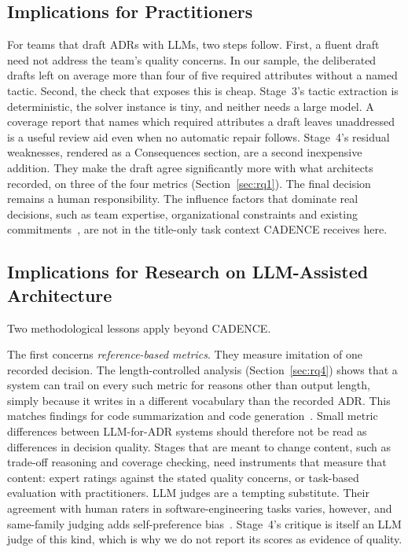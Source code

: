 \documentclass[preprint,12pt,authoryear]{elsarticle}
\renewcommand{\_}{\textunderscore\allowbreak{}}
\begin{document}
\subsection{Implications for Practitioners}

For teams that draft ADRs with LLMs, two steps follow. First, a fluent draft need not address the team's quality concerns. In our sample, the deliberated drafts left on average more than four of five required attributes without a named tactic. Second, the check that exposes this is cheap. Stage~3's tactic extraction is deterministic, the solver instance is tiny, and neither needs a large model. A coverage report that names which required attributes a draft leaves unaddressed is a useful review aid even when no automatic repair follows. Stage~4's residual weaknesses, rendered as a Consequences section, are a second inexpensive addition. They make the draft agree significantly more with what architects recorded, on three of the four metrics (Section~\ref{sec:rq1}). The final decision remains a human responsibility. The influence factors that dominate real decisions, such as team expertise, organizational constraints and existing commitments~\citep{weinreich2015}, are not in the title-only task context CADENCE receives here.

\subsection{Implications for Research on LLM-Assisted Architecture}

Two methodological lessons apply beyond CADENCE.

The first concerns \emph{reference-based metrics}. They measure imitation of one recorded decision. The length-controlled analysis (Section~\ref{sec:rq4}) shows that a system can trail on every such metric for reasons other than output length, simply because it writes in a different vocabulary than the recorded ADR. This matches findings for code summarization and code generation~\citep{roy2021,evtikhiev2023,haque2022}. Small metric differences between LLM-for-ADR systems should therefore not be read as differences in decision quality. Stages that are meant to change content, such as trade-off reasoning and coverage checking, need instruments that measure that content: expert ratings against the stated quality concerns, or task-based evaluation with practitioners. LLM judges are a tempting substitute. Their agreement with human raters in software-engineering tasks varies, however, and same-family judging adds self-preference bias~\citep{wang2025judge,he2026judge}. Stage~4's critique is itself an LLM judge of this kind, which is why we do not report its scores as evidence of quality.
\end{document}

